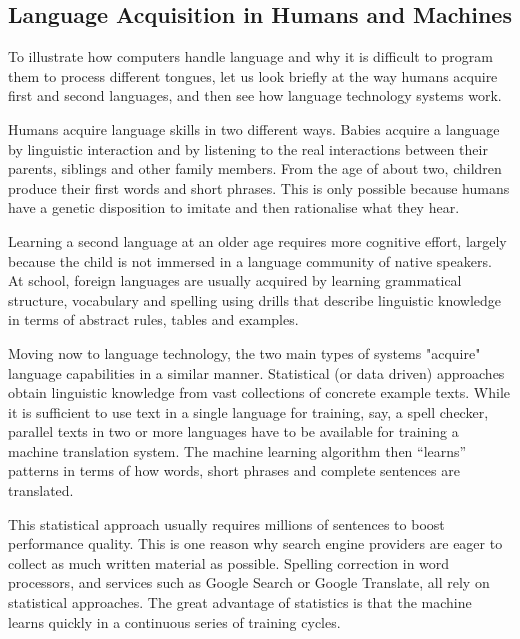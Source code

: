 \begin{multicols}{2}
\subsection{Language Acquisition in Humans and Machines}

To illustrate how computers handle language and why it is difficult to program them to process different tongues, let us look briefly at the way humans acquire first and second languages, and then see how language technology systems work.

Humans acquire language skills in two different ways. Babies acquire a language by linguistic interaction and by listening to the real interactions between their parents, siblings and other family members. From the age of about two, children produce their first words and short phrases. This is only possible because humans have a genetic disposition to imitate and then rationalise what they hear. 

Learning a second language at an older age requires more cognitive effort, largely because the child is not immersed in a language community of native speakers. At school, foreign languages are usually acquired by learning grammatical structure, vocabulary and spelling using drills that describe linguistic knowledge in terms of abstract rules, tables and examples.


Moving now to language technology, the two main types of systems "acquire" language capabilities in a similar manner. Statistical (or data driven) approaches obtain linguistic knowledge from vast collections of concrete example texts. While it is sufficient to use text in a single language for training, say, a spell checker, parallel texts in two or more languages have to be available for training a machine translation system. The machine learning algorithm then “learns” patterns in terms of how words, short phrases and complete sentences are translated. 

This statistical approach usually requires millions of sentences to boost performance quality. This is one reason why search engine providers are eager to collect as much written material as possible. Spelling correction in word processors, and services such as Google Search or Google Translate, all rely on statistical approaches. The great advantage of statistics is that the machine learns quickly in a continuous series of training cycles.


\end{multicols}
